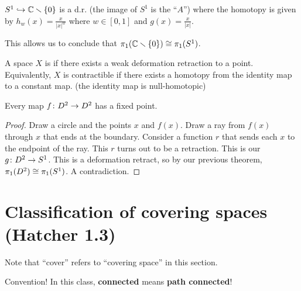 \documentclass[11pt,leqno,oneside]{amsart}
\newenvironment{dateenv}{
  \vspace{1em}
}{
  \vspace{1em}
}
\newcommand{\mydate}[4]{
  \newdate{#1}{#2}{#3}{#4}
  \begin{dateenv}
    \hfill\displaydate{#1}
  \end{dateenv}
}
\numberwithin{thm}{section}
\newcommand{\minus}{\smallsetminus}
\newcommand{\fund}[1][1]{\pi_{#1}}
\begin{document}
\begin{example}
  $S^1 \into \C\minus\{0\}$ is a d.r. (the image of $S^1$ is the ``$A$'') where the homotopy is given by $h_w(x) = \frac{x}{|x|^w}$ where $w \in [0,1]$  and $g(x) = \frac{x}{|x|}$.

  This allows us to conclude that $\fund(\C\minus\{0\}) \isom \fund(S^1)$.
\end{example}
\begin{defn}
  A space $X$ is  if there exists a weak deformation retraction to a point.  Equivalently, $X$ is contractible if there exists a homotopy from the identity map to a constant map. (the identity map is null-homotopic)
\end{defn}
\begin{thm}
  Every map $f\colon D^2 \to D^2$ has a fixed point.
\end{thm}

\begin{proof}
  Draw a circle and the points $x$ and $f(x)$.  Draw a ray from $f(x)$ through $x$ that ends at the boundary.  Consider a function $r$ that sends each $x$ to the endpoint of the ray.  This $r$ turns out to be a retraction.  This is our $g\colon D^2 \to S^1$.  This is a deformation retract, so by our previous theorem, $\fund(D^2) \isom \fund(S^1)$.  A contradiction.
\end{proof}

\mydate{d8}{13}{2}{2017}

\section{Classification of covering spaces (Hatcher 1.3)}

Note that ``cover'' refers to ``covering space'' in this section.

Convention!  In this class, \textbf{connected} means \textbf{path connected}!
\end{document}
